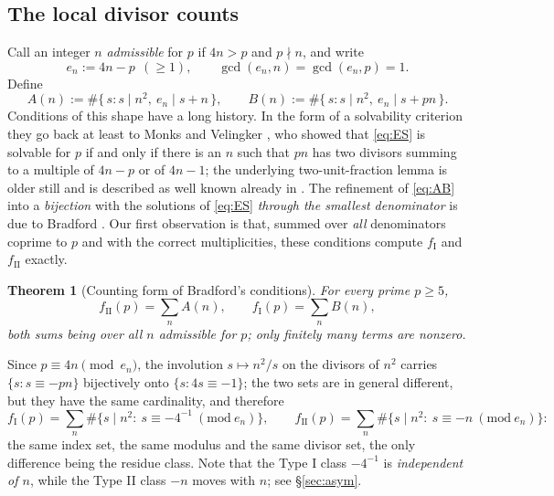 \documentclass[11pt,reqno]{amsart}
\theoremstyle{plain}
\newtheorem{theorem}{Theorem}[section]
\theoremstyle{definition}
\numberwithin{equation}{section}
\newcommand{\fI}{f_{\mathrm{I}}}
\newcommand{\fII}{f_{\mathrm{II}}}
\begin{document}
\subsection{The local divisor counts}
Call an integer $n$ \emph{admissible} for $p$ if $4n>p$ and $p\nmid n$, and write
\begin{equation}\label{eq:en}
  e_{n}:=4n-p\ \ (\ge1),\qquad \gcd(e_{n},n)=\gcd(e_{n},p)=1 .
\end{equation}
Define
\begin{equation}\label{eq:AB}
  A(n):=\#\{\,s: s\mid n^{2},\ e_{n}\mid s+n\,\},\qquad
  B(n):=\#\{\,s: s\mid n^{2},\ e_{n}\mid s+pn\,\}.
\end{equation}
Conditions of this shape have a long history. In the form of a solvability criterion
they go back at least to Monks and Velingker \cite[Cor.~2.3]{MonksVelingker}, who
showed that \eqref{eq:ES} is solvable for $p$ if and only if there is an $n$ such that
$pn$ has two divisors summing to a multiple of $4n-p$ or of $4n-1$; the underlying
two-unit-fraction lemma is older still and is described as well known already in
\cite[Thm.~2.2]{MonksVelingker}. The refinement of \eqref{eq:AB} into a
\emph{bijection} with the solutions of \eqref{eq:ES} \emph{through the smallest
denominator} is due to Bradford \cite{Bradford2}. Our first observation is that, summed
over \emph{all} denominators coprime to $p$ and with the correct multiplicities, these
conditions compute $\fI$ and $\fII$ exactly.

\begin{theorem}[Counting form of Bradford's conditions]\label{thm:count}
For every prime $p\ge5$,
\[
  \fII(p)=\sum_{n}A(n),\qquad \fI(p)=\sum_{n}B(n),
\]
both sums being over all $n$ admissible for $p$; only finitely many terms are nonzero.
\end{theorem}

Since $p\equiv 4n\pmod{e_{n}}$, the involution $s\mapsto n^{2}/s$ on the divisors of
$n^{2}$ carries $\{s: s\equiv-pn\}$ bijectively onto $\{s: 4s\equiv-1\}$; the two sets
are in general different, but they have the same cardinality, and therefore
\begin{equation}\label{eq:two-classes}
  \fI(p)=\sum_{n}\#\{s\mid n^{2}:\ s\equiv-4^{-1}\ (\mathrm{mod}\ e_{n})\},\qquad
  \fII(p)=\sum_{n}\#\{s\mid n^{2}:\ s\equiv-n\ (\mathrm{mod}\ e_{n})\}:
\end{equation}
the same index set, the same modulus and the same divisor set, the only difference
being the residue class. Note that the Type I class $-4^{-1}$ is \emph{independent of
$n$}, while the Type II class $-n$ moves with $n$; see \S\ref{sec:asym}.
\end{document}
